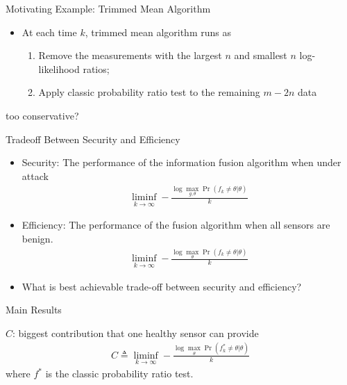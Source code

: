 \documentclass[10pt]{beamer}
\newlength\figureheight
\newlength\figurewidth
\newcommand{\tikzdir}[1]{#1.tikz}
\newcommand{\inputtikz}[1]{}}
\DeclareMathOperator{\pr}{Pr}
\begin{document}
\begin{frame}{Motivating Example: Trimmed Mean Algorithm}
    \begin{center}
    \setlength{\figureheight}{2cm}
    \setlength{\figurewidth}{10cm}
    \inputtikz{blockdiagram}
  \end{center}
\begin{itemize}
  \item At each time $k$, trimmed mean algorithm runs as
   \begin{enumerate}
     \item Remove the measurements with the largest $n$ and smallest $n$ log-likelihood ratios;
     \item Apply classic probability ratio test to the remaining $m-2n$ data
   \end{enumerate}
\end{itemize}
\begin{center}
  {\Large{ {\color{red}too conservative?}}}
\end{center}
\end{frame}







\begin{frame}{Tradeoff Between Security and Efficiency}
  \begin{itemize}
  \item Security: The performance of the information fusion algorithm when under attack
        \begin{align*}
    \liminf_{k\rightarrow\infty} - \frac{\log \max_{g,\theta} \pr(f_k\neq \theta|\theta)}{k}
  \end{align*}
  \item Efficiency: The performance of the fusion algorithm when all sensors are benign.
          \begin{align*}
    \liminf_{k\rightarrow\infty} - \frac{\log \max_{\theta} \pr(f_k\neq \theta|\theta)}{k}
  \end{align*}
  \item What is best achievable trade-off between security and efficiency?
  \end{itemize}
\end{frame}

\begin{frame}{Main Results}
      \begin{center}
        \inputtikz{fun_lim}
      \end{center}
\vspace{-5mm}
$C$: biggest contribution that one healthy sensor can provide
         \begin{align*}
    C\triangleq    \liminf_{k\rightarrow\infty} - \frac{\log \max_{\theta} \pr(f_k^*\neq \theta|\theta)}{k}
  \end{align*}
  where $f^*$ is the classic probability ratio test.
\end{frame}
\end{document}
